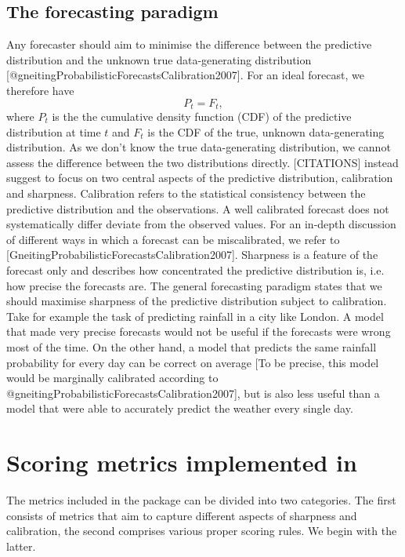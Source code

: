 \documentclass[article]{jss}
\begin{document}
\subsection{The forecasting paradigm}

Any forecaster should aim to minimise the difference between the predictive distribution and the unknown true data-generating distribution [@gneitingProbabilisticForecastsCalibration2007]. For an ideal forecast, we therefore have 
%
$$ P_t = F_t, $$
%
where $P_t$ is the the cumulative density function (CDF) of the predictive distribution at time $t$ and $F_t$ is the CDF of the true, unknown data-generating distribution. As we don't know the true data-generating distribution, we cannot assess the difference between the two distributions directly. [CITATIONS] instead suggest to focus on two central aspects of the predictive distribution, calibration and sharpness. Calibration refers to the statistical consistency between the predictive distribution and the observations. A well calibrated forecast does not systematically differ deviate from the observed values. For an in-depth discussion of different ways in which a forecast can be miscalibrated, we refer to [GneitingProbabilisticForecastsCalibration2007]. Sharpness is a feature of the forecast only and describes how concentrated the predictive distribution is, i.e. how precise the forecasts are. The general forecasting paradigm states that we should maximise sharpness of the predictive distribution subject to calibration. Take for example the task of predicting rainfall in a city like London. A model that made very precise forecasts would not be useful if the forecasts were wrong most of the time. On the other hand, a model that predicts the same rainfall probability for every day can be correct on average [To be precise, this model would be marginally calibrated according to @gneitingProbabilisticForecastsCalibration2007], but is also less useful than a model that were able to accurately predict the weather every single day. %


\section[metrics]{Scoring metrics implemented in }

The metrics included in the  package can be divided into two categories. The first consists of metrics that aim to capture different aspects of sharpness and calibration, the second comprises various proper scoring rules. We begin with the latter. 
\end{document}
